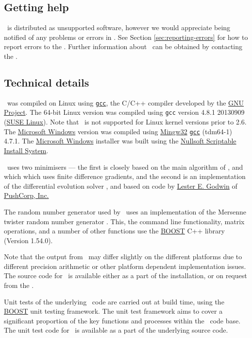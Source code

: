 \subsection{Getting help}
\CH
\SAM\ is distributed as unsupported software, however we would appreciate being notified of any problems or errors in \SAM. See Section \ref{sec:reporting-errors} for how to report errors to the \authors. Further information about \SAM\ can be obtained by contacting the \authors.

\subsection{Technical details}
\CH
\SAM\ was compiled on Linux using \href{http://gcc.gnu.org}{\texttt{gcc}}, the C/C++ compiler developed by the \href{http://gcc.gnu.org}{GNU Project}. The 64-bit Linux  version was compiled using \texttt{gcc} version 4.8.1 20130909 (\href{http://www.opensuse.org/}{SUSE Linux}). Note that \SAM\ is not supported for Linux kernel versions prior to 2.6. The \href{http://www.microsoft.com}{Microsoft Windows} version was compiled using \href{http://www.mingw.org}{Mingw32} \href{http://gcc.gnu.org}{\texttt{gcc}} (tdm64-1) 4.7.1. The \href{http://www.microsoft.com}{Microsoft Windows} installer was built using the \href{http://nsis.sourceforge.net/Main_Page}{Nullsoft Scriptable Install System}.

\SAM\ uses two minimisers --- the first is closely based on the main algorithm of \cite{779}, and which which uses finite difference gradients, and the second is an implementation of the differential evolution solver \citep{1442}, and based on code by \href{mailto:<godwin@pushcorp.com>}{Lester E. Godwin} of \href{http://www.pushcorp.com}{PushCorp, Inc.} 

The random number generator used by \SAM\ uses an implementation of the Mersenne twister random number generator \citep{796}. This, the command line functionality, matrix operations, and a number of other functions use the \href{http://www.boost.org/}{BOOST} C++ library (Version 1.54.0).

Note that the output from \SAM\ may differ slightly on the different platforms due to different precision arithmetic or other platform dependent implementation issues. The source code for \SAM\ is available either as a part of the installation, or on request from the \authors.

Unit tests of the underlying \SAM\ code are carried out at build time, using the \href{http://www.boost.org/}{BOOST} unit testing framework. The unit test framework aims to cover a significant proportion of the key functions and processes within the \SAM\ code base. The unit test code for \SAM\ is available as a part of the underlying source code.

